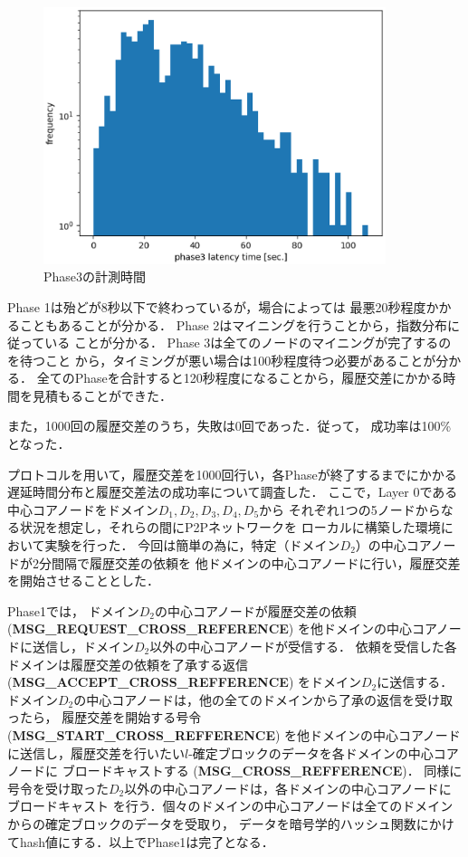 \documentclass[a4paper,12pt]{jsarticle}
\begin{document}
%
%
\begin{figure}[H]%
  \begin{center}
    \includegraphics[width=100mm]{pht/phase3-sec-hist.eps}
  \end{center}
  \caption{Phase3の計測時間}
  \label{fig:phase3}
\end{figure}
%
Phase 1は殆どが8秒以下で終わっているが，場合によっては
最悪20秒程度かかることもあることが分かる．
Phase 2はマイニングを行うことから，指数分布に従っている
ことが分かる．
Phase 3は全てのノードのマイニングが完了するのを待つこと
から，タイミングが悪い場合は100秒程度待つ必要があることが分かる．
全てのPhaseを合計すると120秒程度になることから，履歴交差にかかる時間を見積もることができた．

また，1000回の履歴交差のうち，失敗は0回であった．従って，
成功率は100\%となった．

プロトコルを用いて，履歴交差を1000回行い，各Phaseが終了するまでにかかる
遅延時間分布と履歴交差法の成功率について調査した．
ここで，Layer 0である中心コアノードをドメイン$D_1, D_2, D_3, D_4, D_5$から
それぞれ1つの5ノードからなる状況を想定し，それらの間にP2Pネットワークを
ローカルに構築した環境において実験を行った．
今回は簡単の為に，特定（ドメイン$D_2$）の中心コアノードが2分間隔で履歴交差の依頼を
他ドメインの中心コアノードに行い，履歴交差を開始させることとした．

Phase1では，
ドメイン$D_2$の中心コアノードが履歴交差の依頼 (\textbf{MSG\_REQUEST\_CROSS\_REFERENCE})
を他ドメインの中心コアノードに送信し，ドメイン$D_2$以外の中心コアノードが受信する．
依頼を受信した各ドメインは履歴交差の依頼を了承する返信 (\textbf{MSG\_ACCEPT\_CROSS\_REFFERENCE})
をドメイン$D_2$に送信する．
ドメイン$D_2$の中心コアノードは，他の全てのドメインから了承の返信を受け取ったら，
履歴交差を開始する号令 (\textbf{MSG\_START\_CROSS\_REFFERENCE}) を他ドメインの中心コアノード
に送信し，履歴交差を行いたい$l$-確定ブロックのデータを各ドメインの中心コアノードに
ブロードキャストする (\textbf{MSG\_CROSS\_REFFERENCE})．
同様に号令を受け取った$D_2$以外の中心コアノードは，各ドメインの中心コアノードにブロードキャスト
を行う．個々のドメインの中心コアノードは全てのドメインからの確定ブロックのデータを受取り，
データを暗号学的ハッシュ関数にかけてhash値にする．以上でPhase1は完了となる．
\end{document}
